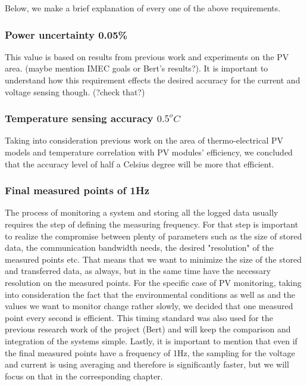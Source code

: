 Below, we make a brief explanation of every one of the above requirements.

\subsubsection{Power uncertainty 0.05\%}
This value is based on results from previous work and experiments on the PV area. (maybe mention IMEC goals or Bert's results?). It is important to understand how this requirement effects the desired accuracy for the current and voltage sensing though. (?check that?)

\subsubsection{Temperature sensing accuracy $0.5^oC$}
Taking into consideration previous work on the area of thermo-electrical PV models and temperature correlation with PV modules' efficiency, we concluded that the accuracy level of half a Celsius degree will be more that efficient.

\subsubsection{Final measured points of 1Hz}
The process of monitoring a system and storing all the logged data usually requires the step of defining the measuring frequency. For that step is important to realize the compromise between plenty of parameters such as the size of stored data, the communication bandwidth needs, the desired "resolution" of the measured points etc. That means that we want to minimize the size of the stored and transferred data, as always, but in the same time have the necessary resolution on the measured points. For the specific case of PV monitoring, taking into consideration the fact that the environmental conditions as well as and the values we want to monitor change rather slowly, we decided that one measured point every second is efficient. This timing standard was also used for the previous research work of the project (Bert) and will keep the comparison and integration of the systems simple. Lastly, it is important to mention that even if the final measured points have a frequency of 1Hz, the sampling for the voltage and current is using averaging and therefore is significantly faster, but we will focus on that in the corresponding chapter.

